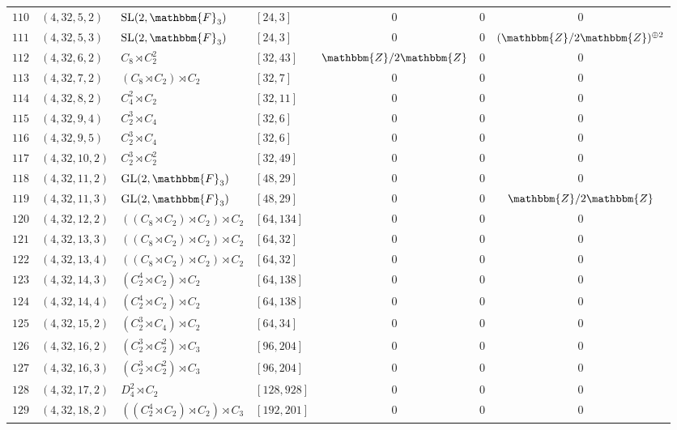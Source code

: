 \documentclass{amsart}
\theoremstyle{plain}
\theoremstyle{definition}
\theoremstyle{remark}
\newcommand{\bZ}{\mathbbm{Z}}\newcommand{\bQ}{\mathbbm{Q}}
\newcommand{\bF}{\mathbbm{F}}\newcommand{\bP}{\mathbbm{P}}
\newcommand{\GL}{{\rm GL}}\newcommand{\SL}{{\rm SL}}
\begin{document}
{\begin{longtable}{llll|ccc}
$110$ & $( 4, 32, 5, 2 )$ & $\SL(2,\bF_3)$ & $[ 24, 3 ]$& $0$ & $0$ & $0$\\
$111$ & $( 4, 32, 5, 3 )$ & $\SL(2,\bF_3)$ & $[ 24, 3 ]$& $0$ & $0$ & $(\bZ/2\bZ)^{\oplus 2}$\\
$112$ & $( 4, 32, 6, 2 )$ & $C_8 \rtimes C_2^2$ & $[ 32, 43 ]$& $\bZ/2\bZ$ & $0$ & $0$\\
$113$ & $( 4, 32, 7, 2 )$ & $(C_8 \rtimes C_2) \rtimes C_2$ & $[ 32, 7 ]$& $0$ & $0$ & $0$\\
$114$ & $( 4, 32, 8, 2 )$ & $C_4^2 \rtimes C_2$ & $[ 32, 11 ]$& $0$ & $0$ & $0$\\
$115$ & $( 4, 32, 9, 4 )$ & $C_2^3 \rtimes C_4$ & $[ 32, 6 ]$& $0$ & $0$ & $0$\\
$116$ & $( 4, 32, 9, 5 )$ & $C_2^3 \rtimes C_4$ & $[ 32, 6 ]$& $0$ & $0$ & $0$\\
$117$ & $( 4, 32, 10, 2 )$ & $C_2^3 \rtimes C_2^2$ & $[ 32, 49 ]$& $0$ & $0$ & $0$\\
$118$ & $( 4, 32, 11, 2 )$ & $\GL(2,\bF_3)$ & $[ 48, 29 ]$& $0$ & $0$ & $0$\\
$119$ & $( 4, 32, 11, 3 )$ & $\GL(2,\bF_3)$ & $[ 48, 29 ]$& $0$ & $0$ & $\bZ/2\bZ$\\
$120$ & $( 4, 32, 12, 2 )$ & $((C_8 \rtimes C_2) \rtimes C_2) \rtimes C_2$ & $[ 64, 134 ]$& $0$ & $0$ & $0$\\
$121$ & $( 4, 32, 13, 3 )$ & $((C_8 \rtimes C_2) \rtimes C_2) \rtimes C_2$ & $[ 64, 32 ]$& $0$ & $0$ & $0$\\
$122$ & $( 4, 32, 13, 4 )$ & $((C_8 \rtimes C_2) \rtimes C_2) \rtimes C_2$ & $[ 64, 32 ]$& $0$ & $0$ & $0$\\
$123$ & $( 4, 32, 14, 3 )$ & $(C_2^4 \rtimes C_2) \rtimes C_2$ & $[ 64, 138 ]$& $0$ & $0$ & $0$\\
$124$ & $( 4, 32, 14, 4 )$ & $(C_2^4 \rtimes C_2) \rtimes C_2$ & $[ 64, 138 ]$& $0$ & $0$ & $0$\\
$125$ & $( 4, 32, 15, 2 )$ & $(C_2^3 \rtimes C_4) \rtimes C_2$ & $[ 64, 34 ]$& $0$ & $0$ & $0$\\
$126$ & $( 4, 32, 16, 2 )$ & $(C_2^3 \rtimes C_2^2) \rtimes C_3$ & $[ 96, 204 ]$& $0$ & $0$ & $0$\\
$127$ & $( 4, 32, 16, 3 )$ & $(C_2^3 \rtimes C_2^2) \rtimes C_3$ & $[ 96, 204 ]$& $0$ & $0$ & $0$\\
$128$ & $( 4, 32, 17, 2 )$ & $D_4^2 \rtimes C_2$ & $[ 128, 928 ]$& $0$ & $0$ & $0$\\
$129$ & $( 4, 32, 18, 2 )$ & $((C_2^4 \rtimes C_2) \rtimes C_2) \rtimes C_3$ & $[ 192, 201 ]$& $0$ & $0$ & $0$\\

\end{longtable}}
\end{document}
